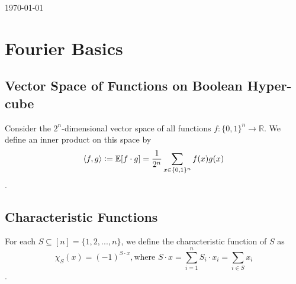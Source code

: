 \begin{titlepage}

{\large \today}\\[3cm] %


 

\vfill %

\end{titlepage}

\chapter{Fourier Basics}
\section{Vector Space of Functions on Boolean Hyper-cube}
\begin{definition}
Consider the $2^n$-dimensional vector space of all functions 
$f : \{ 0,1 \}^n \rightarrow\mathbb{R}$. 
We define an inner product on this space by 
$$\langle f, g \rangle 
\vcentcolon= \mathbb{E}[f \cdot g] 
= \frac{1}{2^n}\sum\limits_{x  \in \{ 0,1 \}^n} f(x)g(x)$$. 
\end{definition}
\section{Characteristic Functions}
\begin{definition} 
For each $S \subseteq [n] = \{1,2,..., n\}$, we define the characteristic function  of $S$ as 
$${\chi}_S(x) = (-1)^{S \cdot x}, \text{where } S \cdot x = \sum\limits_{i=1}^{n} S_i \cdot x_i = \sum \limits_{i \in S} x_i $$.
\end{definition}

